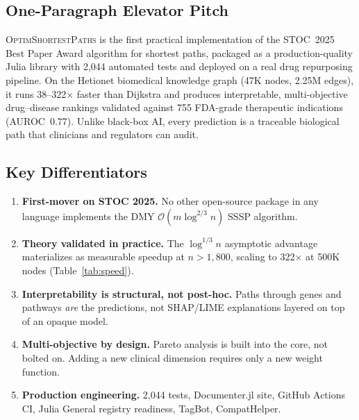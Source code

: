 \documentclass[11pt,a4paper]{article}
\newcommand{\BigO}[1]{\mathcal{O}(#1)}
\newcommand{\optim}{\textsc{OptimShortestPaths}}
\begin{document}

\subsection{One-Paragraph Elevator Pitch}

\optim{} is the first practical implementation of the STOC~2025
Best Paper Award algorithm for shortest paths, packaged as a
production-quality Julia library with 2{,}044 automated tests and
deployed on a real drug repurposing pipeline.  On the Hetionet
biomedical knowledge graph (47K nodes, 2.25M edges), it runs
38--322$\times$ faster than Dijkstra and produces interpretable,
multi-objective drug--disease rankings validated against 755
FDA-grade therapeutic indications (AUROC~0.77).  Unlike black-box
AI, every prediction is a traceable biological path that clinicians
and regulators can audit.

\subsection{Key Differentiators}

\begin{enumerate}
    \item \textbf{First-mover on STOC 2025.}  No other open-source
    package in any language implements the DMY
    $\BigO{m \log^{2/3} n}$ SSSP algorithm.

    \item \textbf{Theory validated in practice.}  The
    $\log^{1/3} n$ asymptotic advantage materializes as measurable
    speedup at $n > 1{,}800$, scaling to 322$\times$ at 500K nodes
    (Table~\ref{tab:speed}).

    \item \textbf{Interpretability is structural, not post-hoc.}
    Paths through genes and pathways \emph{are} the predictions,
    not SHAP/LIME explanations layered on top of an opaque model.

    \item \textbf{Multi-objective by design.}  Pareto analysis is
    built into the core, not bolted on.  Adding a new clinical
    dimension requires only a new weight function.

    \item \textbf{Production engineering.}  2{,}044 tests,
    Documenter.jl site, GitHub Actions CI, Julia General registry
    readiness, TagBot, CompatHelper.
\end{enumerate}
\end{document}
